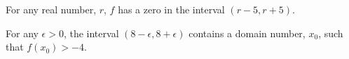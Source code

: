 \documentclass{ximera}
\begin{document}
\begin{exercise}
\begin{question}
\end{question}





\begin{question} 



For any real number, $r$, $f$ has a zero in the interval $(r - 5, r + 5)$.
\begin{multipleChoice}
\end{multipleChoice}






For any $\epsilon > 0$, the interval $(8 - \epsilon, 8 + \epsilon)$ contains a domain number, $x_0$, such that $f(x_0) > -4$.
\begin{multipleChoice}
\end{multipleChoice}





\end{question}














\end{exercise}
\end{document}
